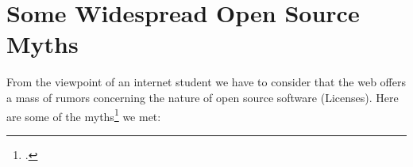 %
%
%
%

%




\section{Some Widespread Open Source Myths}

From the viewpoint of an internet student we have to consider that the web
offers a mass of rumors concerning the nature of open source software
(Licenses). Here are some of the myths\footcite[At least one time even a
scientific legally discussing book is talking about the \enquote{myth around open
source licenses} - although only as part of  the title: cf][1ff,
especially 209ff]{GuiOvd2006a} we met:
 

